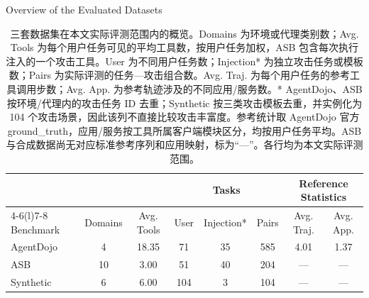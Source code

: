 \documentclass[UTF8]{ctexart}
\begin{document}
\begin{table}[ht]\centering
{\large Overview of the Evaluated Datasets}\par\medskip
\renewcommand{\arraystretch}{1.25}
\begin{tabular*}{.98\linewidth}{@{\extracolsep{\fill}}lccccccc@{}}
\toprule
 & & & \multicolumn{3}{c}{Tasks} & \multicolumn{2}{c}{Reference Statistics} \\
\cmidrule(lr){4-6}\cmidrule(l){7-8}
Benchmark & Domains & Avg. Tools & User & Injection* & Pairs & Avg. Traj. & Avg. App. \\
\midrule
AgentDojo & 4 & 18.35 & 71 & 35 & 585 & 4.01 & 1.37 \\
ASB & 10 & 3.00 & 51 & 40 & 204 & — & — \\
Synthetic & 6 & 6.00 & 104 & 3 & 104 & — & — \\
\bottomrule\end{tabular*}
\caption{三套数据集在本文实际评测范围内的概览。Domains 为环境或代理类别数；Avg. Tools 为每个用户任务可见的平均工具数，按用户任务加权，ASB 包含每次执行注入的一个攻击工具。User 为不同用户任务数；Injection* 为独立攻击任务或模板数；Pairs 为实际评测的任务—攻击组合数。Avg. Traj. 为每个用户任务的参考工具调用步数；Avg. App. 为参考轨迹涉及的不同应用/服务数。* AgentDojo、ASB 按环境/代理内的攻击任务 ID 去重；Synthetic 按三类攻击模板去重，并实例化为 104 个攻击场景，因此该列不直接比较攻击丰富度。参考统计取 AgentDojo 官方 ground_truth，应用/服务按工具所属客户端模块区分，均按用户任务平均。ASB 与合成数据尚无对应标准参考序列和应用映射，标为“—”。各行均为本文实际评测范围。}
\end{table}
\end{document}
